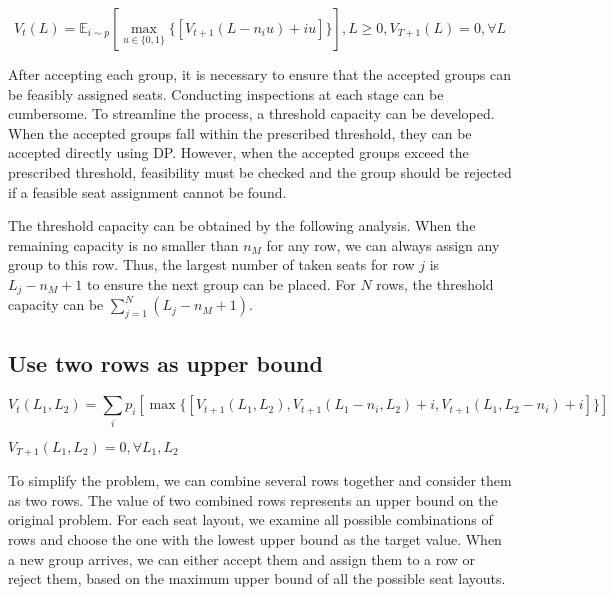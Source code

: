 $$V_{t}(L) = \mathbb{E}_{i \sim p} [\max_{u \in \{0,1\}} \{ {[V_{t+1}(L-n_i u)+ i u]}\}], L \geq 0, V_{T+1}(L) =0, \forall L$$



After accepting each group, it is necessary to ensure that the accepted groups can be feasibly assigned seats. Conducting inspections at each stage can be cumbersome. To streamline the process, a threshold capacity can be developed. When the accepted groups fall within the prescribed threshold, they can be accepted directly using DP. However, when the accepted groups exceed the prescribed threshold, feasibility must be checked and the group should be rejected if a feasible seat assignment cannot be found.


The threshold capacity can be obtained by the following analysis. When the remaining capacity is no smaller than $n_{M}$ for any row, we can always assign any group to this row. Thus, the largest number of taken seats for row $j$ is $L_j -n_{M} +1$ to ensure the next group can be placed. For $N$ rows, the threshold capacity can be $\sum_{j=1}^{N} (L_j -n_{M} +1)$.

\subsection{Use two rows as upper bound}
$$V_{t}(L_1, L_2) = \sum_{i} p_i [\max \{ {[V_{t+1}(L_1, L_2), V_{t+1}(L_1- n_i, L_2)+ i, V_{t+1}(L_1, L_2 - n_i)+i]}\}]$$

$V_{T+1}(L_1, L_2) = 0, \forall L_1, L_2$

To simplify the problem, we can combine several rows together and consider them as two rows. The value of two combined rows represents an upper bound on the original problem. For each seat layout, we examine all possible combinations of rows and choose the one with the lowest upper bound as the target value. When a new group arrives, we can either accept them and assign them to a row or reject them, based on the maximum upper bound of all the possible seat layouts.


